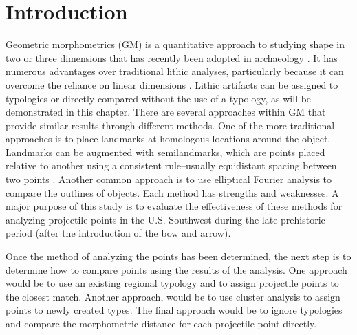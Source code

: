 \documentclass[a4paper]{article}
\begin{document}
\beginningpreprint  %
\linenumbers
\hypertarget{introduction}{%
\section*{Introduction}\label{introduction}}

Geometric morphometrics (GM) is a quantitative approach to studying shape in two or three dimensions that has recently been adopted in archaeology \autocites[see][]{MacLeod2017-yl,Okumura2019-ur}[ for overviews]{Shott2010-fn}. It has numerous advantages over traditional lithic analyses, particularly because it can overcome the reliance on linear dimensions \autocite[196-197]{Shott2010-fn}. Lithic artifacts can be assigned to typologies or directly compared without the use of a typology, as will be demonstrated in this chapter. There are several approaches within GM that provide similar results through different methods. One of the more traditional approaches is to place landmarks at homologous locations around the object. Landmarks can be augmented with semilandmarks, which are points placed relative to another using a consistent rule--usually equidistant spacing between two points \autocite[2-4]{Okumura2019-ur}. Another common approach is to use elliptical Fourier analysis to compare the outlines of objects. Each method has strengths and weaknesses. A major purpose of this study is to evaluate the effectiveness of these methods for analyzing projectile points in the U.S. Southwest during the late prehistoric period (after the introduction of the bow and arrow).

Once the method of analyzing the points has been determined, the next step is to determine how to compare points using the results of the analysis. One approach would be to use an existing regional typology and to assign projectile points to the closest match. Another approach, would be to use cluster analysis to assign points to newly created types. The final approach would be to ignore typologies and compare the morphometric distance for each projectile point directly.
\end{document}
